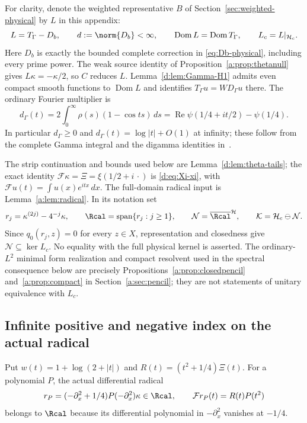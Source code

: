 \documentclass[11pt,a4paper]{article}
\numberwithin{equation}{section}
\theoremstyle{definition}\newtheorem{definition}[theorem]{Definition}
\theoremstyle{remark}\newtheorem{remark}[theorem]{Remark}
\newcommand{\Hh}{\mathcal H}\newcommand{\Hw}{\mathcal H}
\newcommand{\dom}{\operatorname{Dom}}\newcommand{\Var}{\operatorname{Var}}
\newcommand{\Nn}{\mathcal N}\newcommand{\Ii}{\mathcal I}\newcommand{\Zz}{\mathcal Z}
\newcommand{\Kk}{\mathcal K}\newcommand{\Aa}{\mathcal A}\newcommand{\Ff}{\mathcal F}
\begin{document}
For clarity, denote the weighted representative $B$ of
Section~\ref{sec:weighted-physical} by $L$ in this appendix:
\begin{equation}\label{vfourA:eq:actual-operator}
 L=T_\Gamma-D_b,\qquad d:=\norm{D_b}<\infty,\qquad
 \dom L=\dom T_\Gamma,\qquad L_c=L|_{\Hh_c}.
\end{equation}
Here $D_b$ is exactly the bounded complete correction in
\eqref{eq:Db-physical}, including every prime power.  The weak source
identity of Proposition~\ref{a:prop:thetanull} gives
$L\kappa=-\kappa/2$, so $C$ reduces $L$.  Lemma~\ref{d:lem:Gamma-H1}
admits even compact smooth functions to $\dom L$ and identifies
$T_\Gamma u=WD_\Gamma u$ there.  The ordinary Fourier multiplier is
\begin{equation}\label{vfourA:eq:symbol}
 d_\Gamma(t)=2\int_0^\infty\rho(s)(1-\cos ts)\,ds
 =\operatorname{Re}\psi(1/4+it/2)-\psi(1/4).
\end{equation}
In particular $d_\Gamma\ge0$ and
$d_\Gamma(t)=\log|t|+O(1)$ at infinity; these follow from the complete
Gamma integral and the digamma identities in~\cite[Sections 5.9 and 5.11]{DLMF}.

The strip continuation and bounds used below are
Lemma~\ref{d:lem:theta-tails}; the exact identity
$\mathcal F\kappa=\Xi=\xi(1/2+i\,\cdot)$ is
\eqref{d:eq:Xi-xi}, with
$\mathcal Fu(t)=\int u(x)e^{itx}\,dx$.  The full-domain radical input is
Lemma~\ref{a:lem:radical}.  In its notation set
\begin{equation}\label{vfourA:eq:radical-spaces}
 r_j=\kappa^{(2j)}-4^{-j}\kappa,\qquad
 \Rcal=\operatorname{span}\{r_j:j\ge1\},\qquad
 \Nn=\overline{\Rcal}^{\Hh},\qquad \Kk=\Hh_c\ominus\Nn.
\end{equation}
Since $q_0(r_j,z)=0$ for every $z\in X$, representation and closedness
give $\Nn\subseteq\ker L_c$.  No equality with the full physical kernel
is asserted.  The ordinary-$L^2$ minimal form realization and compact
resolvent used in the spectral consequence below are precisely
Propositions~\ref{a:prop:closedpencil} and~\ref{a:prop:compact} in
Section~\ref{a:sec:pencil}; they are not statements of unitary equivalence
with $L_c$.

\subsection{Infinite positive and negative index on the actual radical}
\label{vfourA:subsec:index}

Put $w(t)=1+\log(2+|t|)$ and $R(t)=(t^2+1/4)\Xi(t)$.  For a polynomial
$P$, the actual differential radical
\begin{equation}\label{vfourA:eq:polynomial-radical}
 r_P=(-\partial_x^2+1/4)P(-\partial_x^2)\kappa\in\Rcal,
 \qquad \mathcal F r_P(t)=R(t)P(t^2)
\end{equation}
belongs to $\Rcal$ because its differential polynomial in
$-\partial_x^2$ vanishes at $-1/4$.
\end{document}
